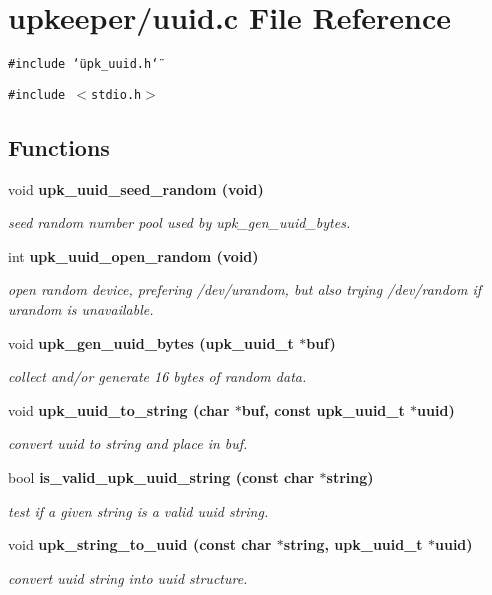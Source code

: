 \section{upkeeper/uuid.c File Reference}
\label{uuid_8c}
{\tt \#include \char`\"{}upk\_\-uuid.h\char`\"{}}\par
{\tt \#include $<$stdio.h$>$}\par
\subsection*{Functions}
\begin{CompactItemize}
\item 
void \bf{upk\_\-uuid\_\-seed\_\-random} (void)
\begin{CompactList}\small\item\em seed random number pool used by upk\_\-gen\_\-uuid\_\-bytes. \item\end{CompactList}\item 
int \bf{upk\_\-uuid\_\-open\_\-random} (void)
\begin{CompactList}\small\item\em open random device, prefering /dev/urandom, but also trying /dev/random if urandom is unavailable. \item\end{CompactList}\item 
void \bf{upk\_\-gen\_\-uuid\_\-bytes} (\bf{upk\_\-uuid\_\-t} $\ast$buf)
\begin{CompactList}\small\item\em collect and/or generate 16 bytes of random data. \item\end{CompactList}\item 
void \bf{upk\_\-uuid\_\-to\_\-string} (char $\ast$buf, const \bf{upk\_\-uuid\_\-t} $\ast$uuid)
\begin{CompactList}\small\item\em convert uuid to string and place in buf. \item\end{CompactList}\item 
bool \bf{is\_\-valid\_\-upk\_\-uuid\_\-string} (const char $\ast$string)
\begin{CompactList}\small\item\em test if a given string is a valid uuid string. \item\end{CompactList}\item 
void \bf{upk\_\-string\_\-to\_\-uuid} (const char $\ast$string, \bf{upk\_\-uuid\_\-t} $\ast$uuid)
\begin{CompactList}\small\item\em convert uuid string into uuid structure. \item\end{CompactList}\end{CompactItemize}
